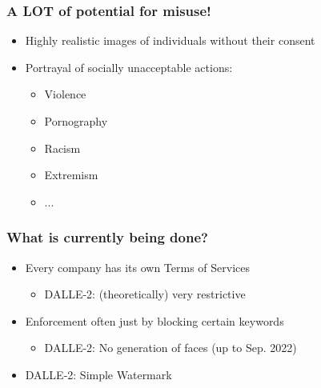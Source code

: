 \documentclass[
	11pt, compress%
]{beamer}
\begin{document}
\begin{frame}
\end{frame}



\begin{frame}
	\frametitle{A LOT of potential for misuse!}
	\begin{itemize}
		\setlength\itemsep{1em}
			\item{Highly realistic images of individuals without their consent}
			\item{Portrayal of socially unacceptable actions:}
			\begin{itemize}
			\setlength\itemsep{0,5em}
			\item{Violence}
			\item{Pornography}
			\item{Racism}
			\item{Extremism}
			\item{...}
			\end{itemize}
	\end{itemize}
\end{frame}

\begin{frame}
	\frametitle{What is currently being done?}
	\begin{itemize}
		\setlength\itemsep{1,3em}
		\item Every company has its own Terms of Services
		\begin{itemize}
			\item DALLE-2: (theoretically) very restrictive
		\end{itemize}
		\item Enforcement often just by blocking certain keywords
		\begin{itemize}
			\item DALLE-2: No generation of faces (up to Sep. 2022)
		\end{itemize}
		\item DALLE-2: Simple Watermark
	\end{itemize}
\end{frame}
\end{document}
